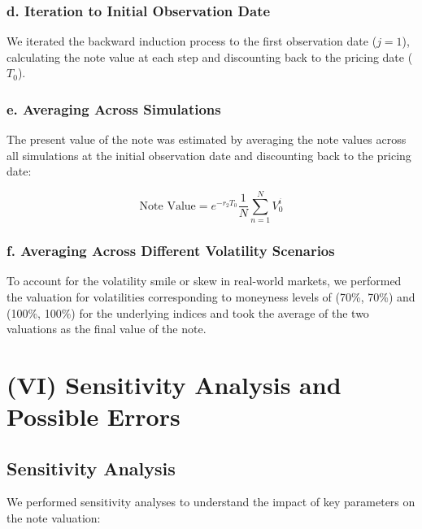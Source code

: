 \documentclass[12pt,a4paper]{article}
\begin{document}
\subsubsection*{d. Iteration to Initial Observation Date}

We iterated the backward induction process to the first observation date (\( j = 1 \)), calculating the note value at each step and discounting back to the pricing date (\( T_0 \)).

\subsubsection*{e. Averaging Across Simulations}

The present value of the note was estimated by averaging the note values across all simulations at the initial observation date and discounting back to the pricing date:

\[
\text{Note Value} = e^{-r_2 T_0} \frac{1}{N} \sum_{n=1}^{N} V^{i}_{0}
\]

\subsubsection*{f. Averaging Across Different Volatility Scenarios}

To account for the volatility smile or skew in real-world markets, we performed the valuation for volatilities corresponding to moneyness levels of (70\%, 70\%) and (100\%, 100\%) for the underlying indices and took the average of the two valuations as the final value of the note.



\section*{(VI) Sensitivity Analysis and Possible Errors}

\subsection*{Sensitivity Analysis}

We performed sensitivity analyses to understand the impact of key parameters on the note valuation:
\end{document}
